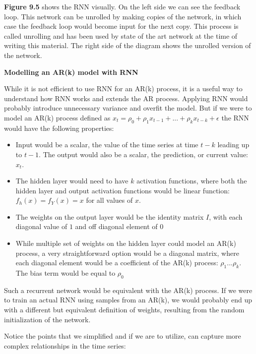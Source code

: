 \textbf{Figure 9.5} shows the RNN visually. On the left side we can see the feedback loop. This network can be unrolled by making copies of the network, in which case the feedback loop would become input for the next copy. This process is called unrolling and has been used by state of the art network at the time of writing this material. The right side of the diagram shows the unrolled version of the network.

\textbf{Modelling an AR(k) model with RNN}

While it is not efficient to use RNN for an AR(k) process, it is a useful way to understand how RNN works and extends the AR process. Applying RNN would probably introduce unnecessary variance and overfit the model. But if we were to model an AR(k) process defined as \(x_t = \rho_0 + \rho_1 x_{t-1} + ... + \rho_k x_{t-k} + \epsilon\) the RNN would have the following properties:

\begin{itemize}
    \item Input would be a scalar, the value of the time series at time \(t-k\) leading up to \(t-1\). The output would also be a scalar, the prediction, or current value: \(x_t\).
    \item The hidden layer would need to have \(k\) activation functions, where both the hidden layer and output activation functions would be linear function: \(f_h(x) = f_Y(x) = x\) for all values of \(x\).
    \item The weights on the output layer would be the identity matrix \(I\), with each diagonal value of \(1\) and off diagonal element of \(0\)
    \item While multiple set of weights on the hidden layer could model an AR(k) process, a very straightforward option would be a diagonal matrix, where each diagonal element would be a coefficient of the AR(k) process: \(\rho_1 ... \rho_k\). The bias term would be equal to \(\rho_0\)
\end{itemize}

Such a recurrent network would be equivalent with the AR(k) process. If we were to train an actual RNN using samples from an AR(k), we would probably end up with a different but equivalent definition of weights, resulting from the random initialization of the network.

Notice the points that we simplified and if we are to utilize, can capture more complex relationships in the time series:

